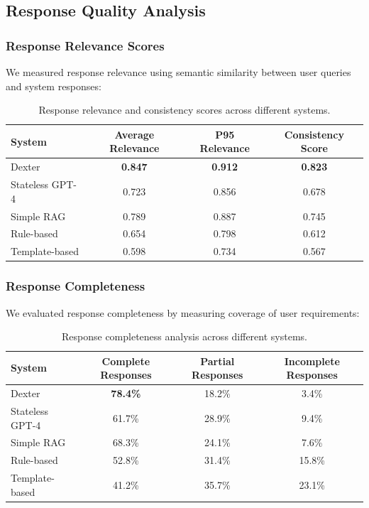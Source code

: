 \documentclass[11pt]{article}
\begin{document}
\subsection{Response Quality Analysis}

\subsubsection{Response Relevance Scores}

We measured response relevance using semantic similarity between user queries and system responses:

\begin{table}[H]
\centering
\begin{tabular}{@{}lccc@{}}
\toprule
System & Average Relevance & P95 Relevance & Consistency Score \\
\midrule
Dexter & \textbf{0.847} & \textbf{0.912} & \textbf{0.823} \\
Stateless GPT-4 & 0.723 & 0.856 & 0.678 \\
Simple RAG & 0.789 & 0.887 & 0.745 \\
Rule-based & 0.654 & 0.798 & 0.612 \\
Template-based & 0.598 & 0.734 & 0.567 \\
\bottomrule
\end{tabular}
\caption{Response relevance and consistency scores across different systems.}
\label{tab:relevance}
\end{table}

\subsubsection{Response Completeness}

We evaluated response completeness by measuring coverage of user requirements:

\begin{table}[H]
\centering
\begin{tabular}{@{}lccc@{}}
\toprule
System & Complete Responses & Partial Responses & Incomplete Responses \\
\midrule
Dexter & \textbf{78.4\%} & 18.2\% & 3.4\% \\
Stateless GPT-4 & 61.7\% & 28.9\% & 9.4\% \\
Simple RAG & 68.3\% & 24.1\% & 7.6\% \\
Rule-based & 52.8\% & 31.4\% & 15.8\% \\
Template-based & 41.2\% & 35.7\% & 23.1\% \\
\bottomrule
\end{tabular}
\caption{Response completeness analysis across different systems.}
\label{tab:completeness}
\end{table}
\end{document}
